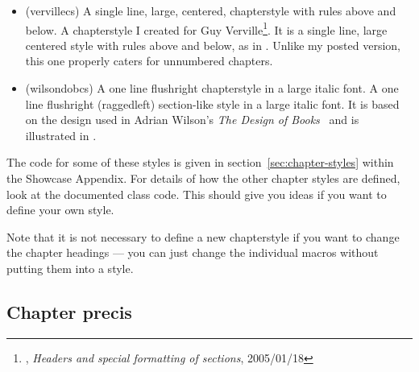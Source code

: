 \begin{itemize}



\item[\cstyle{verville}]
\glossary(vervillecs)%
  {}%
  {A single line, large, centered, chapterstyle with rules above and below.}
 A chapterstyle I created for 
  Guy Verville\footnote{\ctt,
  \textit{Headers and special formatting of sections}, 2005/01/18}. 
  It is a single line, large centered style with rules above 
  and below, as in . Unlike my posted version, 
  this one properly caters for unnumbered chapters.


\item[\cstyle{wilsondob}] 
\glossary(wilsondobcs)%
  {}%
  {A one line flushright chapterstyle in a large italic font.}
A one line flushright (raggedleft) section-like style in a large italic font. 
It is based on the design used in
Adrian Wilson's \textit{The Design of Books}~\cite{ADRIANWILSON93} and 
is illustrated in 
.


\end{itemize}


The code for some of these styles is given in
section~\ref{sec:chapter-styles} within the Showcase Appendix.  For
details of how the other chapter styles are defined, look at the
documented class code. This should give you ideas if you want to
define your own style.

Note that it is not necessary to define a new chapterstyle if you want
to change the chapter headings --- you can just change the individual
macros without putting them into a style.




\subsection{Chapter precis}
\label{sec:chapter-precis}

